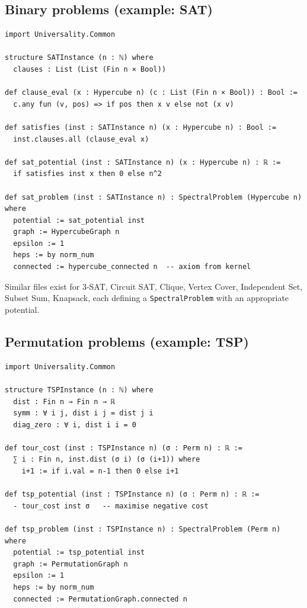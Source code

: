 \documentclass[11pt,a4paper]{article}
\begin{document}
\subsection{Binary problems (example: SAT)}

\begin{lstlisting}[style=lean, caption={Universality/SAT.lean}]
import Universality.Common

structure SATInstance (n : ℕ) where
  clauses : List (List (Fin n × Bool))

def clause_eval (x : Hypercube n) (c : List (Fin n × Bool)) : Bool :=
  c.any fun (v, pos) => if pos then x v else not (x v)

def satisfies (inst : SATInstance n) (x : Hypercube n) : Bool :=
  inst.clauses.all (clause_eval x)

def sat_potential (inst : SATInstance n) (x : Hypercube n) : ℝ :=
  if satisfies inst x then 0 else n^2

def sat_problem (inst : SATInstance n) : SpectralProblem (Hypercube n) where
  potential := sat_potential inst
  graph := HypercubeGraph n
  epsilon := 1
  heps := by norm_num
  connected := hypercube_connected n  -- axiom from kernel
\end{lstlisting}

Similar files exist for 3‑SAT, Circuit SAT, Clique, Vertex Cover, Independent Set, Subset Sum, Knapsack, each defining a \texttt{SpectralProblem} with an appropriate potential.

\subsection{Permutation problems (example: TSP)}

\begin{lstlisting}[style=lean, caption={Universality/TSP.lean}]
import Universality.Common

structure TSPInstance (n : ℕ) where
  dist : Fin n → Fin n → ℝ
  symm : ∀ i j, dist i j = dist j i
  diag_zero : ∀ i, dist i i = 0

def tour_cost (inst : TSPInstance n) (σ : Perm n) : ℝ :=
  ∑ i : Fin n, inst.dist (σ i) (σ (i+1)) where
    i+1 := if i.val = n-1 then 0 else i+1

def tsp_potential (inst : TSPInstance n) (σ : Perm n) : ℝ :=
  - tour_cost inst σ   -- maximise negative cost

def tsp_problem (inst : TSPInstance n) : SpectralProblem (Perm n) where
  potential := tsp_potential inst
  graph := PermutationGraph n
  epsilon := 1
  heps := by norm_num
  connected := PermutationGraph.connected n
\end{lstlisting}
\end{document}
